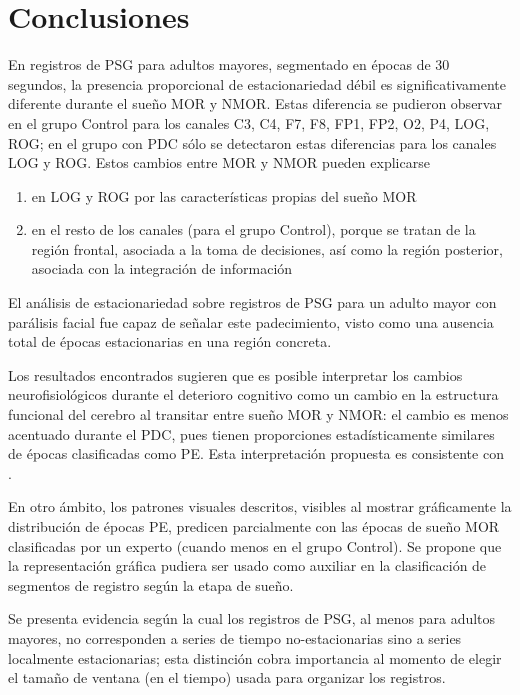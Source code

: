
\section{Conclusiones}

En registros de PSG para adultos mayores, segmentado en épocas de 30 segundos, la presencia 
proporcional de estacionariedad débil es significativamente diferente durante el sueño MOR y 
NMOR.
Estas diferencia se pudieron observar en el grupo Control para los canales C3, C4, F7, F8, FP1, 
FP2, O2, P4, LOG, ROG; en el grupo con PDC sólo se detectaron estas diferencias para los canales 
LOG y ROG.
Estos cambios entre MOR y NMOR pueden explicarse 
\begin{enumerate}
\item en LOG y ROG por las características propias  del sueño MOR
\item en el resto de los canales (para el grupo Control), porque se tratan de la 
región frontal, asociada a la toma de decisiones, así como la región posterior, 
asociada con la integración
de información
\end{enumerate}

El análisis de estacionariedad sobre registros de PSG para un adulto mayor con parálisis facial 
fue capaz de señalar este padecimiento, visto como una ausencia total de épocas estacionarias
en una región concreta.

Los resultados encontrados sugieren que es posible interpretar los cambios neurofisiológicos 
durante el deterioro cognitivo como un cambio en la estructura funcional del cerebro al transitar 
entre sueño MOR y NMOR: el cambio es menos acentuado durante el PDC, pues tienen proporciones 
estadísticamente similares de épocas clasificadas como PE.
Esta interpretación propuesta es consistente con \cite{Valeria}.

En otro ámbito, los patrones visuales descritos, visibles al mostrar gráficamente la 
distribución de épocas PE, predicen parcialmente con las épocas de sueño MOR clasificadas 
por un experto (cuando menos en el grupo Control).
Se propone que la representación gráfica pudiera ser usado como auxiliar en la clasificación 
de segmentos de registro según la etapa de sueño.

Se presenta evidencia según la cual los registros de PSG, al menos para adultos mayores, no 
corresponden a series de tiempo no-estacionarias sino a series localmente estacionarias; esta 
distinción cobra importancia al momento de elegir el tamaño de ventana (en el tiempo) usada 
para organizar los registros.

